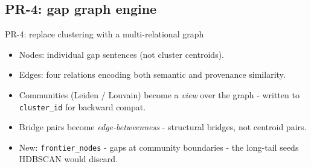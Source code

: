 \documentclass[10pt,aspectratio=169]{beamer}
\begin{document}

\subsection{PR-4: gap graph engine}

\begin{frame}{PR-4: replace clustering with a multi-relational graph}
  \begin{itemize}
    \item Nodes: individual gap sentences (not cluster centroids).
    \item Edges: four relations encoding both semantic and provenance similarity.
    \item Communities (Leiden / Louvain) become a \emph{view} over the graph -
      written to \texttt{cluster\_id} for backward compat.
    \item Bridge pairs become \emph{edge-betweenness} - structural bridges,
      not centroid pairs.
    \item New: \texttt{frontier\_nodes} - gaps at community boundaries -
      the long-tail seeds HDBSCAN would discard.
  \end{itemize}
\end{frame}
\end{document}
